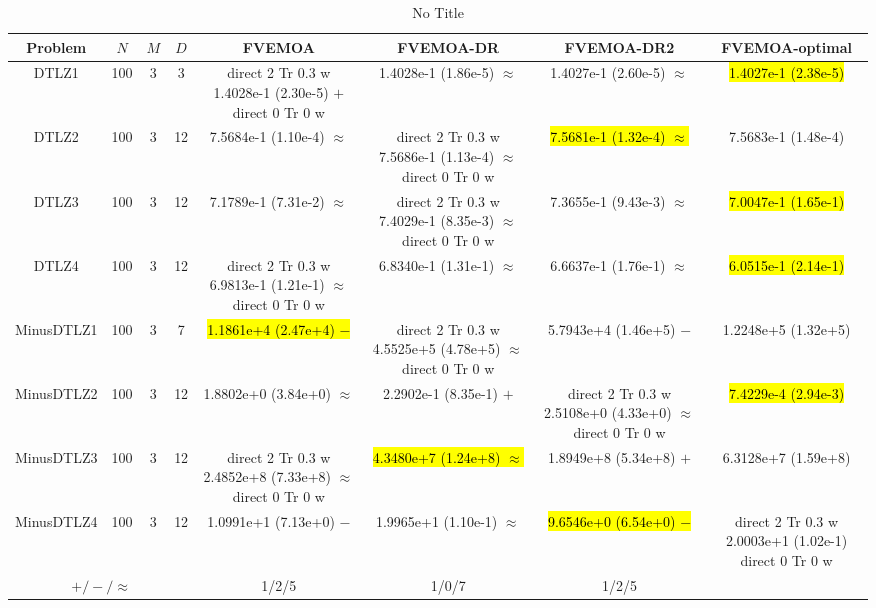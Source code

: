 \documentclass[journal]{IEEEtran}
\newcommand{\semitextbf}[1]{%
\pdfliteral direct {2 Tr 0.3 w} %
#1%
\pdfliteral direct {0 Tr 0 w}%
}
\begin{document}
\begin{table*}[htbp]
\renewcommand{\arraystretch}{1.2}
\centering
\caption{No Title}
\begin{tabular}{cccccccc}
\toprule
Problem&$N$&$M$&$D$&FVEMOA&FVEMOA-DR&FVEMOA-DR2&FVEMOA-optimal\\
\midrule
\multirow{1}{*}{DTLZ1}&100&3&3&\semitextbf{1.4028e-1 (2.30e-5) $+$}&1.4028e-1 (1.86e-5) $\approx$&1.4027e-1 (2.60e-5) $\approx$&\hl{1.4027e-1 (2.38e-5)}\\
\hline
\multirow{1}{*}{DTLZ2}&100&3&12&7.5684e-1 (1.10e-4) $\approx$&\semitextbf{7.5686e-1 (1.13e-4) $\approx$}&\hl{7.5681e-1 (1.32e-4) $\approx$}&7.5683e-1 (1.48e-4)\\
\hline
\multirow{1}{*}{DTLZ3}&100&3&12&7.1789e-1 (7.31e-2) $\approx$&\semitextbf{7.4029e-1 (8.35e-3) $\approx$}&7.3655e-1 (9.43e-3) $\approx$&\hl{7.0047e-1 (1.65e-1)}\\
\hline
\multirow{1}{*}{DTLZ4}&100&3&12&\semitextbf{6.9813e-1 (1.21e-1) $\approx$}&6.8340e-1 (1.31e-1) $\approx$&6.6637e-1 (1.76e-1) $\approx$&\hl{6.0515e-1 (2.14e-1)}\\
\hline
\multirow{1}{*}{MinusDTLZ1}&100&3&7&\hl{1.1861e+4 (2.47e+4) $-$}&\semitextbf{4.5525e+5 (4.78e+5) $\approx$}&5.7943e+4 (1.46e+5) $-$&1.2248e+5 (1.32e+5)\\
\hline
\multirow{1}{*}{MinusDTLZ2}&100&3&12&1.8802e+0 (3.84e+0) $\approx$&2.2902e-1 (8.35e-1) $+$&\semitextbf{2.5108e+0 (4.33e+0) $\approx$}&\hl{7.4229e-4 (2.94e-3)}\\
\hline
\multirow{1}{*}{MinusDTLZ3}&100&3&12&\semitextbf{2.4852e+8 (7.33e+8) $\approx$}&\hl{4.3480e+7 (1.24e+8) $\approx$}&1.8949e+8 (5.34e+8) $+$&6.3128e+7 (1.59e+8)\\
\hline
\multirow{1}{*}{MinusDTLZ4}&100&3&12&1.0991e+1 (7.13e+0) $-$&1.9965e+1 (1.10e-1) $\approx$&\hl{9.6546e+0 (6.54e+0) $-$}&\semitextbf{2.0003e+1 (1.02e-1)}\\
\hline
\multicolumn{4}{c}{$+/-/\approx$}&1/2/5&1/0/7&1/2/5&\\
\bottomrule
\end{tabular}
\label{No Label}
\end{table*}
\end{document}

